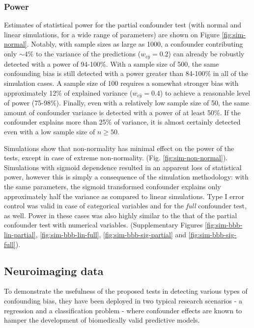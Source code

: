 \documentclass{article}
\begin{document}
\subsubsection*{Power}

Estimates of statistical power for the partial confounder test (with normal and linear simulations, for  a wide range of parameters) are shown on Figure \ref{fig:sim-normal}. Notably, with sample sizes as large as 1000, a confounder contributing only $\sim 4\%$ to the variance of the predictions  ($w_{c\hat{y}} = 0.2$) can already be robustly detected with a power of 94-100\%. With a sample size of 500, the same confounding bias is still detected with a power greater than 84-100\% in all of the simulation cases. A sample size of 100 requires a somewhat stronger bias with approximately 12\% of explained variance ($w_{c\hat{y}}=0.4$) to achieve a reasonable level of power (75-98\%). Finally, even with a relatively low sample size of 50, the same amount of confounder variance is detected with a power of at least 50\%. If the confounder explains more than 25\% of variance, it is almost certainly detected even with a low sample size of $n \geq 50$.

Simulations show that non-normality has minimal effect on the power of the tests, except in case of extreme non-normality. (Fig. \ref{fig:sim-non-normal}). Simulations with sigmoid dependence resulted in an apparent loss of statistical power, however this is simply a consequence of the simulation methodology: with the same parameters, the sigmoid transformed confounder explains only approximately half the variance as compared to linear simulations.
Type I error control was valid in case of categorical variables and for the \emph{full} confounder test, as well. Power in these cases was also highly similar to the that of the partial confounder test with numerical variables. (Supplementary Figures \ref{fig:sim-bbb-lin-partial}, \ref{fig:sim-bbb-lin-full}, \ref{fig:sim-bbb-sig-partial} and \ref{fig:sim-bbb-sig-full}).


\subsection{Neuroimaging data}

To demonstrate the usefulness of the proposed tests in detecting various types of confounding bias, they have been deployed in two typical research scenarios - a regression and a classification problem - where confounder effects are known to hamper the development of biomedically valid predictive models. 
\end{document}
